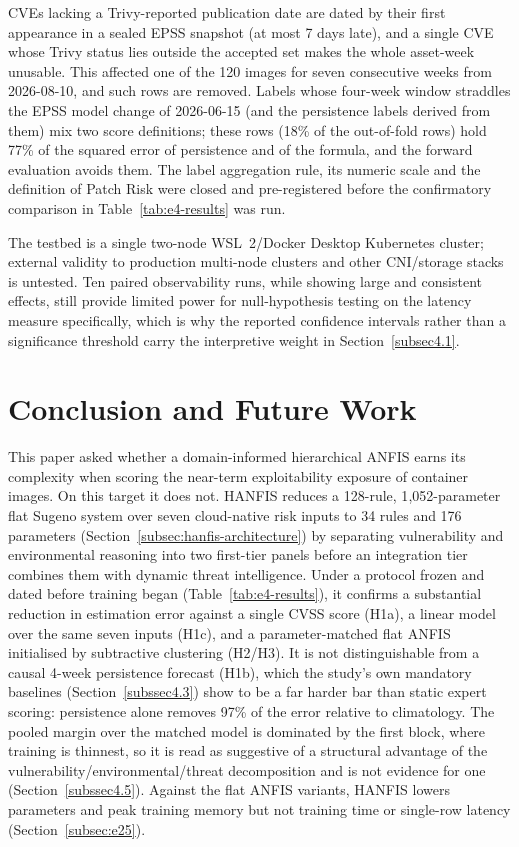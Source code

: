 \documentclass[referee,lineno,pdflatex,sn-basic]{sn-jnl}%
\theoremstyle{thmstyleone}%
\theoremstyle{thmstyletwo}%
\theoremstyle{thmstylethree}%
\begin{document}
CVEs lacking a Trivy-reported publication date are dated by their first appearance in a sealed EPSS snapshot (at most 7 days late), and a single CVE whose Trivy status lies outside the accepted set makes the whole asset-week unusable. This affected one of the 120 images for seven consecutive weeks from 2026-08-10, and such rows are removed. Labels whose four-week window straddles the EPSS model change of 2026-06-15 (and the persistence labels derived from them) mix two score definitions; these rows (18\% of the out-of-fold rows) hold 77\% of the squared error of persistence and of the formula, and the forward evaluation avoids them. The label aggregation rule, its numeric scale and the definition of Patch Risk were closed and pre-registered before the confirmatory comparison in Table~\ref{tab:e4-results} was run.

The testbed is a
single two-node WSL~2/Docker Desktop Kubernetes cluster; external validity to production multi-node
clusters and other CNI/storage stacks is untested. Ten paired observability runs, while showing large
and consistent effects, still provide limited power for null-hypothesis testing on the latency measure
specifically, which is why the reported confidence intervals rather than a significance threshold carry
the interpretive weight in Section~\ref{subsec4.1}.

\section{Conclusion and Future Work}\label{sec6}

This paper asked whether a domain-informed hierarchical ANFIS earns its complexity when scoring the near-term exploitability exposure of container images. On this target it does not. HANFIS reduces a 128-rule, 1{,}052-parameter flat Sugeno system over seven cloud-native risk inputs to 34 rules and 176 parameters (Section~\ref{subsec:hanfis-architecture}) by separating vulnerability and environmental reasoning into two first-tier panels before an integration tier combines them with dynamic threat intelligence. Under a protocol frozen and dated before training began (Table~\ref{tab:e4-results}), it confirms a substantial reduction in estimation error against a single CVSS score (H1a), a linear model over the same seven inputs (H1c), and a parameter-matched flat ANFIS initialised by subtractive clustering (H2/H3). It is not distinguishable from a causal 4-week persistence forecast (H1b), which the study's own mandatory baselines (Section~\ref{subssec4.3}) show to be a far harder bar than static expert scoring: persistence alone removes 97\% of the error relative to climatology. The pooled margin over the matched model is dominated by the first block, where training is thinnest, so it is read as suggestive of a structural advantage of the vulnerability/environmental/threat decomposition and is not evidence for one (Section~\ref{subssec4.5}). Against the flat ANFIS variants, HANFIS lowers parameters and peak training memory but not training time or single-row latency (Section~\ref{subsec:e25}).
\end{document}

